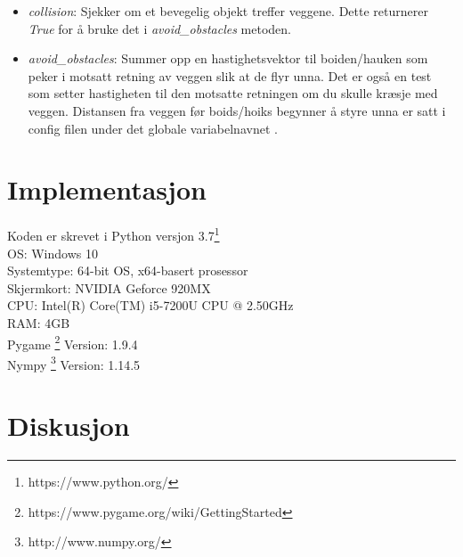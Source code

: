 {\begin{itemize}
    \item \emph{collision}: Sjekker om et bevegelig objekt treffer veggene. Dette returnerer \emph{True} for å bruke det i \emph{avoid\_obstacles} metoden.
    \item \emph{avoid\_obstacles}: Summer opp en hastighetsvektor til boiden/hauken som peker i motsatt retning av veggen slik at de flyr unna. Det er også en test som setter hastigheten til den motsatte retningen om du skulle kræsje med veggen. Distansen fra veggen før boids/hoiks begynner å styre unna er satt i config filen under det globale variabelnavnet \color{purple}{WALL\_DISTANCE\_AVOID\_VALUE}.
\end{itemize}



\section{Implementasjon}
Koden er skrevet i Python versjon 3.7\footnote{https://www.python.org/}\\
OS: Windows 10\\
Systemtype: 64-bit OS, x64-basert prosessor\\
Skjermkort: NVIDIA Geforce 920MX\\
CPU: Intel(R) Core(TM) i5-7200U CPU @ 2.50GHz\\
RAM: 4GB\\
Pygame \footnote{https://www.pygame.org/wiki/GettingStarted} Version: 1.9.4\\
Nympy \footnote{http://www.numpy.org/} Version: 1.14.5\\



\section{Diskusjon}

}
